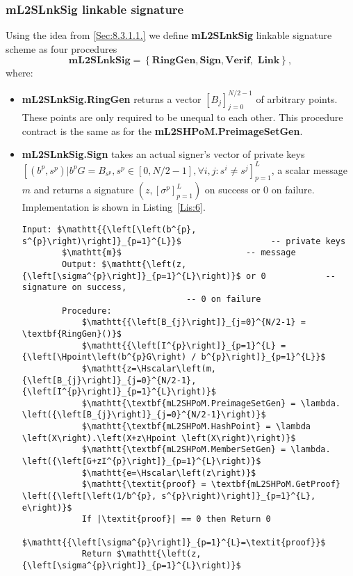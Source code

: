 \documentclass{mathcryptology} %
\newcommand{\Hpoint}{\textbf{H}_{\textbf{point}}}
\newcommand{\Hscalar}{\textbf{H}_{\textbf{scalar}}}
\theoremstyle{title}
\theoremstyle{titleof}
\begin{document}
\subsubsection{mL2SLnkSig linkable signature}
    Using the idea from \ref{Sec:8.3.1.1.} we define \textbf{mL2SLnkSig} linkable signature scheme as four procedures
    \begin{equation*}
        \textbf{mL2SLnkSig} = \left\{
        \textbf{RingGen},
        \textbf{Sign},
        \textbf{Verif},
        \textbf{ Link}
        \right\},
    \end{equation*}
    where:
    \begin{itemize}
        \item \textbf{mL2SLnkSig.RingGen} returns a vector ${\left[B_{j}\right]}_{j=0}^{N/2-1}$ of arbitrary points. These points are only required to be unequal to each other. This procedure contract is the same as for the \textbf{mL2SHPoM.PreimageSetGen}.
        \item \textbf{mL2SLnkSig.Sign} takes an actual signer's vector of private keys\\
        ${\left[\left(b^{p},s^{p}\right) | b^{p} G = B_{s^p}, s^{p}\in \left[0,N/2-1\right], \forall i,j:
        s^{i} \neq s^{j} \right]}_{p=1}^{L}$, a scalar message $m$ and returns a signature $\left(z,{\left[\sigma^{p}\right]}_{p=1}^{L}\right)$ on success or $0$ on failure. Implementation is shown in Listing~\ref{Lis:6}.

        \begin{mdframed}[backgroundcolor=black!10!white]
        \begin{lstlisting}[caption={\textbf{mL2SLnkSig.Sign} implementation.},label={Lis:6}]
        Input: $\mathtt{{\left[\left(b^{p}, s^{p}\right)\right]}_{p=1}^{L}}$                  -- private keys
        $\mathtt{m}$                         -- message
        Output: $\mathtt{\left(z, {\left[\sigma^{p}\right]}_{p=1}^{L}\right)}$ or 0            -- signature on success,
                                 -- 0 on failure
        Procedure:
            $\mathtt{{\left[B_{j}\right]}_{j=0}^{N/2-1} = \textbf{RingGen}()}$
            $\mathtt{{\left[I^{p}\right]}_{p=1}^{L} = {\left[\Hpoint\left(b^{p}G\right) / b^{p}\right]}_{p=1}^{L}}$
            $\mathtt{z=\Hscalar\left(m, {\left[B_{j}\right]}_{j=0}^{N/2-1}, {\left[I^{p}\right]}_{p=1}^{L}\right)}$
            $\mathtt{\textbf{mL2SHPoM.PreimageSetGen} = \lambda. \left({\left[B_{j}\right]}_{j=0}^{N/2-1}\right)}$
            $\mathtt{\textbf{mL2SHPoM.HashPoint} = \lambda \left(X\right).\left(X+z\Hpoint \left(X\right)\right)}$
            $\mathtt{\textbf{mL2SHPoM.MemberSetGen} = \lambda. \left({\left[G+zI^{p}\right]}_{p=1}^{L}\right)}$
            $\mathtt{e=\Hscalar\left(z\right)}$
            $\mathtt{\textit{proof} = \textbf{mL2SHPoM.GetProof} \left({\left[\left(1/b^{p}, s^{p}\right)\right]}_{p=1}^{L}, e\right)}$
            If |\textit{proof}| == 0 then Return 0
            $\mathtt{{\left[\sigma^{p}\right]}_{p=1}^{L}=\textit{proof}}$
            Return $\mathtt{\left(z, {\left[\sigma^{p}\right]}_{p=1}^{L}\right)}$
        \end{lstlisting}
        \end{mdframed}


\end{itemize}
\end{document}
